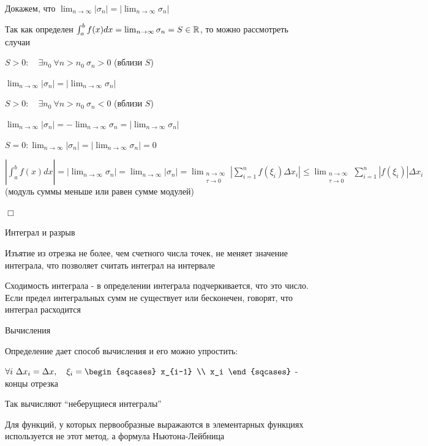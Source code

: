 \documentclass[12pt]{article}
\begin{document}
\begin{enumerate}
        Докажем, что $\lim_{n\to\infty} |\sigma_n| = |\lim_{n\to\infty} \sigma_n|$

        Так как определен $\int^b_a f(x)dx = \lim_{n\to\infty} \sigma_n = S \in \mathbb{R}$, то можно рассмотреть случаи

        $S > 0: \quad \exists n_0 \ \forall n > n_0 \ \sigma_n > 0$ (вблизи $S$)

        $\lim_{n\to\infty} |\sigma_n| = |\lim_{n\to\infty} \sigma_n|$

        $S > 0: \quad \exists n_0 \ \forall n > n_0 \ \sigma_n < 0$ (вблизи $S$)

        $\lim_{n\to\infty} |\sigma_n| = -\lim_{n\to\infty} \sigma_n = |\lim_{n\to\infty} \sigma_n|$

        $S = 0: \lim_{n\to\infty} |\sigma_n| = |\lim_{n\to\infty} \sigma_n| = 0$

        $\left| \int^b_a f(x)dx \left| = |\lim_{n\to\infty} \sigma_n| = \lim_{n\to\infty} |\sigma_n| =
        \lim_{\substack{n\to\infty \\ \tau\to0}} \left|\sum_{i=1}^n f(\xi_i) \Delta x_i\right| \leq \lim_{\substack{n\to\infty \\ \tau\to0}} \sum_{i=1}^n |f(\xi_i)| \Delta x_i$ (модуль суммы меньше или равен сумме модулей)

        $\Box$

    \end{enumerate}

    \Nota Интеграл и разрыв

    Изъятие из отрезка не более, чем счетного числа точек, не меняет значение интеграла, что позволяет считать интеграл на интервале

    \Nota Сходимость интеграла - в определении интеграла подчеркивается, что это число.
    Если предел интегральных сумм не существует или бесконечен, говорят, что интеграл расходится

    \Nota Вычисления

    Определение дает способ вычисления и его можно упростить:

    $\forall i\ \Delta x_i = \Delta x, \quad \xi_i = \begin{sqcases}
                                                         x_{i-1} \\ x_i
    \end{sqcases}$ - концы отрезка

    Так вычисляют \enquote{неберущиеся интегралы}

    Для функций, у которых первообразные выражаются в элементарных функциях используется не этот метод, а формула Ньютона-Лейбница
\end{document}
